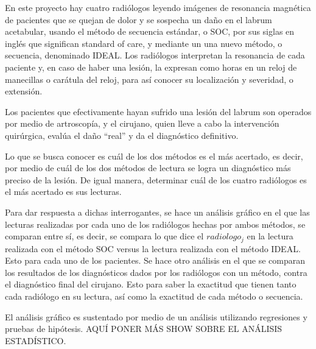 \documentclass[11pt]{book}
\newcommand{\forceindent}{\leavevmode{\parindent=2em\indent}} %
\begin{document}
			
			
			
			\forceindent En este proyecto hay cuatro radiólogos leyendo imágenes de resonancia magnética de pacientes que se quejan de dolor y se sospecha un daño en el labrum acetabular, usando el método de secuencia estándar, o SOC, por sus siglas en inglés que significan standard of care, y mediante un una nuevo método, o secuencia, denominado IDEAL. Los radiólogos interpretan la resonancia de cada paciente y, en caso de haber una lesión, la expresan como horas en un reloj de manecillas o carátula del reloj, para así conocer su localización y severidad, o extensión.
			
			\forceindent Los pacientes que efectivamente hayan sufrido una lesión del labrum son operados por medio de artroscopía, y el cirujano, quien lleve a cabo la intervención quirúrgica, evalúa el daño ``real'' y da el diagnóstico definitivo. 
			
			\forceindent Lo que se busca conocer es cuál de los dos métodos es el más acertado, es decir, por medio de cuál de los dos métodos de lectura se logra un diagnóstico más preciso de la lesión. De igual manera, determinar cuál de los cuatro radiólogos es el más acertado es sus lecturas.
			
			
			\forceindent Para dar respuesta a dichas interrogantes, se hace un análisis gráfico en el que las lecturas realizadas por cada uno de los radiólogos hechas por ambos métodos, se comparan entre sí, es decir, se compara lo que dice el $radiologo_{j}$ en la lectura realizada con el método SOC versus la lectura realizada con el método IDEAL. Esto para cada uno de los pacientes. Se hace otro análisis en el que se comparan los resultados de los diagnósticos dados por los radiólogos con un método, contra el diagnóstico final del cirujano. Esto para saber la exactitud que tienen tanto cada radiólogo en su lectura, así como la exactitud de cada método o secuencia.
			
			\forceindent El análisis gráfico es sustentado por medio de un análisis utilizando regresiones y pruebas de hipótesis. AQUÍ PONER MÁS SHOW SOBRE EL ANÁLISIS ESTADÍSTICO.
			
\end{document}
